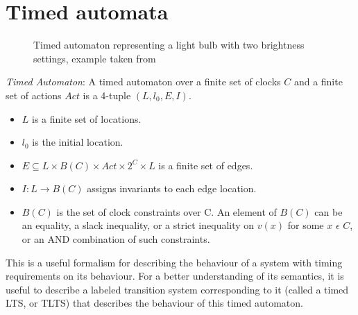 \documentclass[a4paper]{llncs}
\begin{document}
\section{Timed automata}

\begin{SCfigure}
  \centering

  \caption{Timed automaton representing a light bulb with two
    brightness settings, example taken from \cite{aceto2007reactive}}
\end{SCfigure}

\begin{definition}
  \emph{Timed Automaton}: A timed automaton
  \cite{Alur94atheory} over a finite set of clocks $C$
  and a finite set of actions $Act$ is a 4-tuple $(L, l_{0}, E, I)$.
  \begin{itemize}
  \item $L$ is a finite set of locations.
  \item $l_{0}$ is the initial location.
  \item $E \subseteq L \times B(C) \times Act \times 2^{C} \times L$
    is a finite set of edges.
  \item $I: L \rightarrow B(C)$ assigns invariants to each edge
    location.
  \item $B(C)$ is the set of clock constraints over C. An element of $B(C)$
    can be an equality, a slack inequality, or a strict inequality on
    $v(x)$ for some $x$ $\epsilon$ $C$, or
    an AND combination of such constraints.
  \end{itemize}
\end{definition}

This is a useful formalism for describing the behaviour of a system
with timing requirements on its behaviour. For a better understanding
of its semantics, it is useful to describe a labeled transition system
corresponding to it (called a timed LTS, or TLTS) that describes the
behaviour of this timed automaton.
\end{document}
